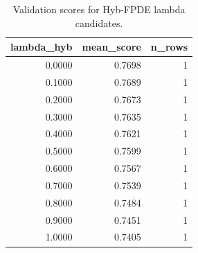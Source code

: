 \begin{table}[t]
\caption{Validation scores for Hyb-FPDE lambda candidates.}
\label{tab:lambda_distribution_computed}
\centering
\begin{tabular}{rrr}
\toprule
lambda\_hyb & mean\_score & n\_rows \\
\midrule
0.0000 & 0.7698 & 1 \\
0.1000 & 0.7689 & 1 \\
0.2000 & 0.7673 & 1 \\
0.3000 & 0.7635 & 1 \\
0.4000 & 0.7621 & 1 \\
0.5000 & 0.7599 & 1 \\
0.6000 & 0.7567 & 1 \\
0.7000 & 0.7539 & 1 \\
0.8000 & 0.7484 & 1 \\
0.9000 & 0.7451 & 1 \\
1.0000 & 0.7405 & 1 \\
\bottomrule
\end{tabular}

\end{table}
